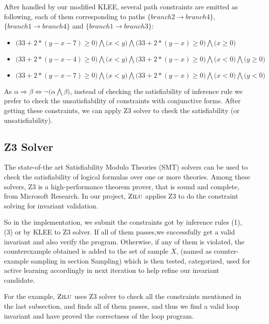 After handled by our modified KLEE,
several path constraints are emitted as following, each of them corresponding to paths 
$\{branch2 \to branch4\}$, $\{branch1 \to branch4\}$ and $\{branch1 \to branch3\}$:


\begin{itemize}
\item $\big(33+2*(y-x-7)\ge0\big) \bigwedge \big(x<y\big) \bigwedge \big(33+2*(y-x)\ge0\big) \bigwedge \big(x\ge0\big)$
\item $\big(33+2*(y-x-4)\ge0\big) \bigwedge \big(x<y\big) \bigwedge \big(33+2*(y-x)\ge0\big) \bigwedge \big(x<0\big) \bigwedge \big(y\ge0\big)$
\item $\big(33+2*(y-x-7)\ge0\big) \bigwedge \big(x<y\big) \bigwedge \big(33+2*(y-x)\ge0\big) \bigwedge \big(x<0\big) \bigwedge \big(y<0\big)$
\end{itemize}
As $\alpha \Rightarrow \beta \Longleftrightarrow \neg \big(\alpha \bigwedge \beta\big)$, 
instead of checking the satisfiability of inference rule
we prefer to check the unsatisfiability of constraints with conjunctive forms. 
After getting these constraints, we can apply Z3 solver to check the satisfiability (or unsatisfiability).

\subsection{Z3 Solver}
The state-of-the art Satisfiability Modulo Theories (SMT) solvers can be used to check the satisfiability of logical formulas over one or more theories. 
Among these solvers, Z3 is a high-performance theorem prover, that is sound and complete, from Microsoft Research.
In our project, $\textsc{Zilu}$ applies Z3 to do the constraint solving for invariant validation. 

So in the implementation, we submit the constraints got by inference rules (1), (3) or by KLEE to Z3 solver.
If all of them passes,we successfully get a valid invariant and also verify the program. 
Otherwise, if any of them is violated, the counterexample obtained is added to the set of sample $X$, 
(named as counter-example sampling in section Sampling)
which is then tested, categorized, used for active learning accordingly in next iteration to help refine our invariant candidate.

For the example, $\textsc{Zilu}$ uses Z3 solver to check all the constraints mentioned in the last subsection,
and finds all of them passes, and thus we find a valid loop invariant and have proved the correctness of the loop program.

